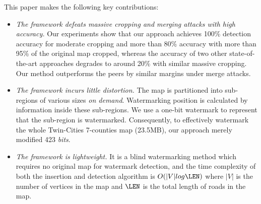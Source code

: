 %
This paper makes the following key contributions:
\begin{itemize}
\item {\em The framework defeats massive cropping and merging
attacks with high accuracy.} Our experiments show that
our approach achieves 100\% detection accuracy for moderate
cropping and more than 80\% accuracy with more than 95\% of the original
map cropped, whereas the accuracy of two other state-of-the-art approaches
degrades to around 20\% with similar massive cropping. Our method outperforms
the peers by similar margins under merge attacks. 


\item {\em The framework incurs little distortion.} 
The map is partitioned into sub-regions of various sizes {\em on demand}. 
Watermarking position is calculated by information inside these sub-regions. 
We use a one-bit watermark to represent that the 
sub-region is watermarked.  Consequently, to effectively watermark the whole
Twin-Cities 7-counties map (23.5MB), our approach merely modified 
423 {\em bits}. 

\item {\em The framework is lightweight.} It is a blind watermarking method
which requires no original map for watermark detection, 
and the time complexity of both the insertion
and detection algorithm is $O(|V|log\LEN)$ where $|V|$ is the number of vertices in
the map and $\LEN$ is the total length of roads in the map.
\end{itemize}

